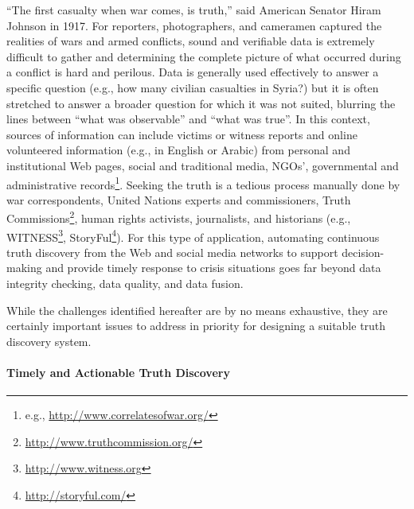 \documentclass[prodmode,acmtecs]{acmsmall} %
\begin{document}
``The first casualty when war comes, is truth,'' said American Senator Hiram Johnson in 1917. 
For reporters, photographers, and cameramen captured the realities of wars and armed conflicts, sound 
and verifiable data is extremely difficult to gather and determining the complete picture of what 
occurred during a conflict is hard and perilous.
Data is generally used effectively to answer a specific question (e.g., how many civilian casualties in Syria?) 
but it is often stretched to answer a broader question for which it was not suited, blurring the 
lines between ``what was observable'' and  ``what was true''. In this context, 
sources of information can include victims or witness reports  and online volunteered information (e.g., in English or Arabic) 
from personal and institutional Web pages, social and traditional media, NGOs', governmental and 
administrative records\footnote{\scriptsize{e.g., \url{http://www.correlatesofwar.org/}}}. %
Seeking the truth is a tedious process manually done by war correspondents, United Nations experts and commissioners, 
Truth Commissions\footnote{\scriptsize{\url{ http://www.truthcommission.org/}}}, human rights activists, journalists, and historians 
 (e.g., WITNESS\footnote{\scriptsize{\url{http://www.witness.org}}}, StoryFul\footnote{\scriptsize{\url{http://storyful.com/}}}). 
For this type of application, automating continuous truth discovery from the Web and social media networks to support decision-making and provide timely response to crisis situations goes far beyond data integrity checking, data quality, and data fusion. 




 While the challenges identified hereafter  are by no means exhaustive, they are certainly important issues to address in priority for designing a suitable truth discovery system.


\paragraph*{Timely and Actionable Truth Discovery} 
\end{document}
